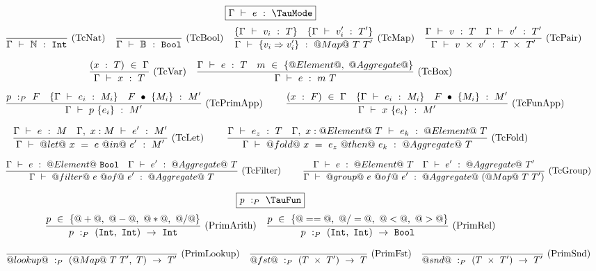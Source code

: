 
\begin{figure*}

$$
\boxed{\Typecheck{\Gamma}{e}{\TauMode}}
$$
$$
\enskip \frac {\displaystyle 
} {\displaystyle  
    \Gamma ~\vdash~ \mathbb{N}~:~\mathtt{Int}
} \  \mbox{(TcNat)} \enskip
\enskip \frac {\displaystyle 
} {\displaystyle  
    \Gamma ~\vdash~ \mathbb{B}~:~\mathtt{Bool}
} \  \mbox{(TcBool)} \enskip
\enskip \frac {\displaystyle 
  \{ \Gamma ~\vdash~ v_i~:~T \}
  \quad
  \{ \Gamma ~\vdash~ v_i'~:~T' \}
} {\displaystyle  
    \Gamma ~\vdash~ \{v_i \Rightarrow v_i'\}~:~@Map@~T~T'
} \  \mbox{(TcMap)} \enskip
\enskip \frac {\displaystyle 
  \Gamma ~\vdash~ v~:~T
  \quad
  \Gamma ~\vdash~ v'~:~T'
} {\displaystyle  
    \Gamma ~\vdash~ v~\times~v'~:~T~\times~T'
} \  \mbox{(TcPair)} \enskip
$$

$$
\enskip \frac {\displaystyle 
    (x~:~T)~\in~\Gamma
} {\displaystyle  
    \Gamma ~\vdash~ x~:~T
} \  \mbox{(TcVar)} \enskip
\enskip \frac {\displaystyle 
  \Gamma ~\vdash~ e~:~T
  \quad
  m~\in~\{@Element@,~@Aggregate@\}
} {\displaystyle  
    \Gamma ~\vdash~ e~:~m~T
} \  \mbox{(TcBox)} \enskip
$$

$$
\enskip \frac {\displaystyle 
    p~:_P~F
    \quad
    \{ \Gamma ~\vdash~ e_i~:~M_i \}
    \quad
    F~\bullet~\{M_i\}~:~M'
} {\displaystyle  
    \Gamma ~\vdash~ p~\{e_i\}~:~M'
} \  \mbox{(TcPrimApp)} \enskip~~~~
\enskip \frac {\displaystyle 
    (x~:~F)~\in~\Gamma
    \quad
    \{ \Gamma ~\vdash~ e_i~:~M_i \}
    \quad
    F~\bullet~\{M_i\}~:~M'
} {\displaystyle  
    \Gamma ~\vdash~ x~\{e_i\}~:~M'
} \  \mbox{(TcFunApp)} \enskip
$$

$$
\enskip \frac {\displaystyle 
  \Gamma ~\vdash~ e~:~M
  \quad
  \Gamma,~x:M ~\vdash~ e'~:~M'
} {\displaystyle 
  \Gamma ~\vdash~ @let@~x~=~e~@in@~e'~:~M'
} \  \mbox{(TcLet)} \enskip~~~~
\enskip \frac {\displaystyle 
  \Gamma ~\vdash~ e_z~:~T
  \quad
  \Gamma,~x:@Element@~T ~\vdash~ e_k~:~@Element@~T
} {\displaystyle 
  \Gamma ~\vdash~ @fold@~x~=~e_z~@then@~e_k~:~@Aggregate@~T
} \  \mbox{(TcFold)} \enskip
$$

$$
\enskip \frac {\displaystyle 
  \Gamma ~\vdash~ e~:~@Element@~\mathtt{Bool}
  \quad
  \Gamma ~\vdash~ e'~:~@Aggregate@~T
} {\displaystyle 
  \Gamma ~\vdash~ @filter@~e~@of@~e'~:~@Aggregate@~T
} \  \mbox{(TcFilter)} \enskip~~~~
\enskip \frac {\displaystyle 
  \Gamma ~\vdash~ e~:~@Element@~T
  \quad
  \Gamma ~\vdash~ e'~:~@Aggregate@~T'
} {\displaystyle 
  \Gamma ~\vdash~ @group@~e~@of@~e'~:~@Aggregate@~(@Map@~T~T')
} \  \mbox{(TcGroup)} \enskip
$$


$$
\boxed{\TypecheckP{\mi{p}}{\TauFun}}
$$
$$
\enskip \frac {\displaystyle 
  p~\in~\{@+@,~@-@,~@*@,~@/@\}
} {\displaystyle 
  p~:_P~(\mathtt{Int},~\mathtt{Int})~\to~\mathtt{Int}
} \  \mbox{(PrimArith)} \enskip
\enskip \frac {\displaystyle 
  p~\in~\{@==@,~@/=@,~@<@,~@>@\}
} {\displaystyle 
  p~:_P~(\mathtt{Int},~\mathtt{Int})~\to~\mathtt{Bool}
} \  \mbox{(PrimRel)} \enskip
$$

$$
\enskip \frac {\displaystyle } {\displaystyle 
  @lookup@~:_P~(@Map@~T~T',~T)~\to~T'
} \  \mbox{(PrimLookup)} \enskip
\enskip \frac {\displaystyle } {\displaystyle 
  @fst@~:_P~(T~\times~T')~\to~T
} \  \mbox{(PrimFst)} \enskip
\enskip \frac {\displaystyle } {\displaystyle 
  @snd@~:_P~(T~\times~T')~\to~T'
} \  \mbox{(PrimSnd)} \enskip
$$




\end{figure*}
